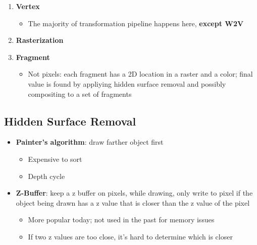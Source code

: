   \begin{enumerate}
    \item \textbf{Vertex}
    \begin{itemize}
      \item The majority of transformation pipeline happens here,
      \textbf{except W2V}
    \end{itemize}
    \item \textbf{Rasterization}
    \item \textbf{Fragment}
    \begin{itemize}
      \item Not pixels: each fragment has a 2D location in a raster and a color;
      final value is found by appliying hidden surface removal and possibly
      compositing to a set of fragments
    \end{itemize}
  \end{enumerate}

  \subsection{Hidden Surface Removal}

    \begin{itemize}
      \item \textbf{Painter's algorithm}: draw farther object first
      \begin{itemize}
        \item Expensive to sort
        \item Depth cycle
      \end{itemize}

      \item \textbf{Z-Buffer}: keep a z buffer on pixels, while drawing,
      only write to pixel if the object being drawn has a z value that is
      closer than the z value of the pixel
      \begin{itemize}
        \item More popular today; not used in the past for memory issues
        \item If two z values are too close, it's hard to determine which is
        closer
      \end{itemize}
    \end{itemize}
